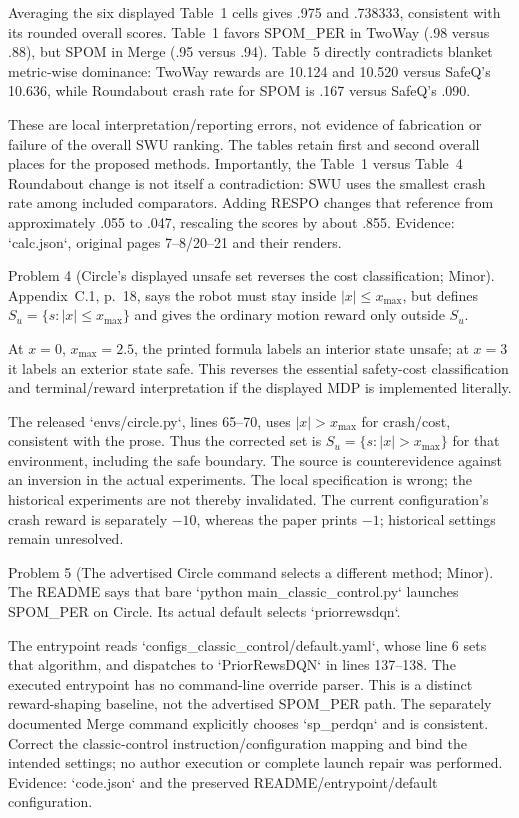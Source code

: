 \documentclass[10pt]{article}
\begin{document}
Averaging the six displayed Table 1 cells gives .975 and .738333, consistent with its rounded overall scores. Table 1 favors SPOM\_PER in TwoWay (.98 versus .88), but SPOM in Merge (.95 versus .94). Table 5 directly contradicts blanket metric-wise dominance: TwoWay rewards are 10.124 and 10.520 versus SafeQ’s 10.636, while Roundabout crash rate for SPOM is .167 versus SafeQ’s .090.\par
These are local interpretation/reporting errors, not evidence of fabrication or failure of the overall SWU ranking. The tables retain first and second overall places for the proposed methods. Importantly, the Table 1 versus Table 4 Roundabout change is not itself a contradiction: SWU uses the smallest crash rate among included comparators. Adding RESPO changes that reference from approximately .055 to .047, rescaling the scores by about .855. Evidence: `calc.json`, original pages 7–8/20–21 and their renders.\par
Problem 4 (Circle’s displayed unsafe set reverses the cost classification; Minor).  Appendix C.1, p. 18, says the robot must stay inside \(|x|\leq x_{\max}\), but defines \(S_u=\{s:|x|\leq x_{\max}\}\) and gives the ordinary motion reward only outside \(S_u\).\par
At \(x=0\), \(x_{\max}=2.5\), the printed formula labels an interior state unsafe; at \(x=3\) it labels an exterior state safe. This reverses the essential safety-cost classification and terminal/reward interpretation if the displayed MDP is implemented literally.\par
The released `envs/circle.py`, lines 65–70, uses \(|x|>x_{\max}\) for crash/cost, consistent with the prose. Thus the corrected set is \(S_u=\{s:|x|>x_{\max}\}\) for that environment, including the safe boundary. The source is counterevidence against an inversion in the actual experiments. The local specification is wrong; the historical experiments are not thereby invalidated. The current configuration’s crash reward is separately \(-10\), whereas the paper prints \(-1\); historical settings remain unresolved.\par
Problem 5 (The advertised Circle command selects a different method; Minor).  The README says that bare `python main\_classic\_control.py` launches SPOM\_PER on Circle. Its actual default selects `priorrewsdqn`.\par
The entrypoint reads `configs\_classic\_control/default.yaml`, whose line 6 sets that algorithm, and dispatches to `PriorRewsDQN` in lines 137–138. The executed entrypoint has no command-line override parser. This is a distinct reward-shaping baseline, not the advertised SPOM\_PER path. The separately documented Merge command explicitly chooses `sp\_perdqn` and is consistent. Correct the classic-control instruction/configuration mapping and bind the intended settings; no author execution or complete launch repair was performed. Evidence: `code.json` and the preserved README/entrypoint/default configuration.\par
\end{document}
